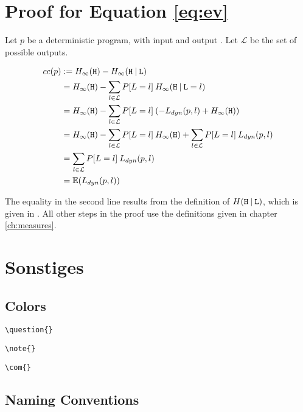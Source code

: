 \chapter{Proof for Equation \ref{eq:ev}}\label{ch:evProof}

Let $p$ be a deterministic program, with input \In and output \Out. Let $\mathcal{L}$ be the set of possible outputs.

\begin{align*}
    cc(p) &:= H_\infty(\mathtt{H}) - H_\infty(\mathtt{H} \: | \: \mathtt{L}) \\
    &= H_\infty(\mathtt{H}) - \sum\limits_{l \in \mathcal{L}} P[L = l]\: H_\infty(\mathtt{H} \: | \: \mathtt{L} = l) \\
    &= H_\infty(\mathtt{H}) - \sum\limits_{l \in \mathcal{L}} P[L = l]\: (-L_{dyn}(p, l) + H_\infty(\mathtt{H})) \\
    &= H_\infty(\mathtt{H}) - \sum\limits_{l \in \mathcal{L}} P[L = l]\: H_\infty(\mathtt{H}) + \sum\limits_{l \in \mathcal{L}} P[L = l]\: L_{dyn}(p, l) \\
    &= \sum\limits_{l \in \mathcal{L}} P[L = l] \: L_{dyn}(p, l) \\
    &= \mathbb{E}(L_{dyn}(p,l))
\end{align*}

The equality in the second line results from the definition of $H( \mathtt{H} \: |\: \mathtt{L})$, which is given in \cite{smith09}. All other steps in the proof use the definitions given in chapter \ref{ch:measures}.

\chapter{Sonstiges}
\section{Colors}

  \begin{verbatim}\question{}\end{verbatim}
 \begin{verbatim}\note{}\end{verbatim}
 \begin{verbatim}\com{}\end{verbatim}
\section{Naming Conventions}
